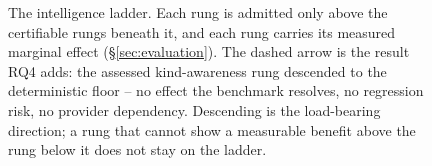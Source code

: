 \begin{figure}[t]
\caption{The intelligence ladder. Each rung is admitted only above the
certifiable rungs beneath it, and each rung carries its measured
marginal effect (\S\ref{sec:evaluation}). The dashed arrow is the
result RQ4 adds: the assessed kind-awareness rung descended to the
deterministic floor -- no effect the benchmark resolves, no regression
risk, no provider dependency. Descending is the load-bearing direction;
a rung that cannot show a measurable benefit above the rung below it
does not stay on the ladder.}
\label{fig:ladder}
\end{figure}
